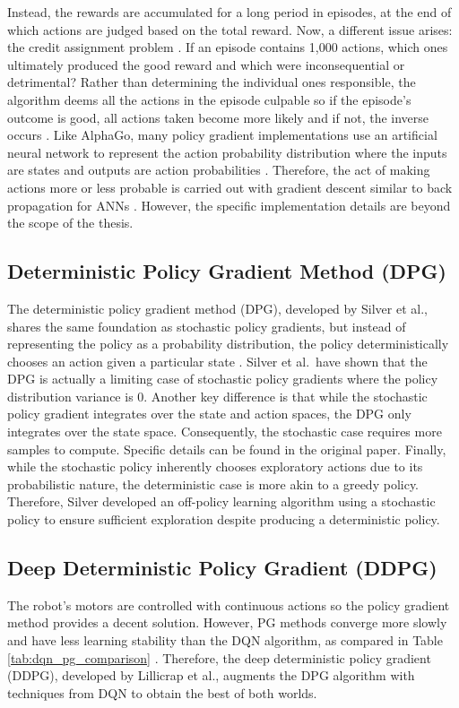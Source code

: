 Instead, the rewards are accumulated for a long period in episodes, at the end of which actions are judged based on the total reward. Now, a different issue arises: the credit assignment problem \cite{fu_2008}. If an episode contains 1,000 actions, which ones ultimately produced the good reward and which were inconsequential or detrimental? Rather than determining the individual ones responsible, the algorithm deems all the actions in the episode culpable so if the episode's outcome is good, all actions taken become more likely and if not, the inverse occurs \cite{karpathy_2016}. Like AlphaGo, many policy gradient implementations use an artificial neural network to represent the action probability distribution where the inputs are states and outputs are action probabilities \cite{silver_2017}. Therefore, the act of making actions more or less probable is carried out with gradient descent similar to back propagation for ANNs \cite{karpathy_2016}. However, the specific implementation details are beyond the scope of the thesis.

\subsection{Deterministic Policy Gradient Method (DPG)}
The deterministic policy gradient method (DPG), developed by Silver et al., shares the same foundation as stochastic policy gradients, but instead of representing the policy as a probability distribution, the policy deterministically chooses an action given a particular state \cite{silver_lever_heess_degris_wierstra_riedmiller}. Silver et al.\ have shown that the DPG is actually a limiting case of stochastic policy gradients where the policy distribution variance is 0. Another key difference is that while the stochastic policy gradient integrates over the state and action spaces, the DPG only integrates over the state space. Consequently, the stochastic case requires more samples to compute. Specific details can be found in the original paper. Finally, while the stochastic policy inherently chooses exploratory actions due to its probabilistic nature, the deterministic case is more akin to a greedy policy. Therefore, Silver developed an off-policy learning algorithm using a stochastic policy to ensure sufficient exploration despite producing a deterministic policy.

\subsection{Deep Deterministic Policy Gradient (DDPG)} \label{sec:ddpg}
The robot's motors are controlled with continuous actions so the policy gradient method provides a decent solution. However, PG methods converge more slowly and have less learning stability than the DQN algorithm, as compared in Table \ref{tab:dqn_pg_comparison} \cite{yu_dqn_vs_pg}. Therefore, the deep deterministic policy gradient (DDPG), developed by Lillicrap et al., augments the DPG algorithm with techniques from DQN to obtain the best of both worlds.


